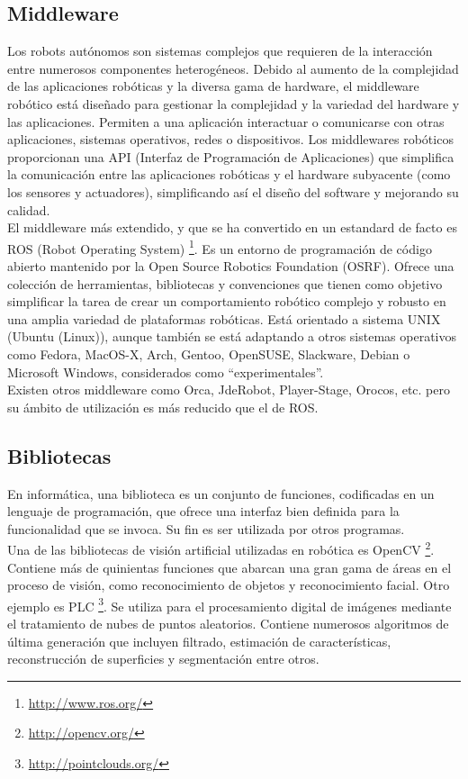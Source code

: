 \subsection{Middleware}
Los robots autónomos son sistemas complejos que requieren de la interacción entre numerosos componentes heterogéneos. Debido al aumento de la complejidad de las aplicaciones robóticas y la diversa gama de hardware, el middleware robótico está diseñado para gestionar la complejidad y la variedad del hardware y las aplicaciones. Permiten a una aplicación interactuar o comunicarse con otras aplicaciones, sistemas operativos, redes o dispositivos. Los middlewares robóticos proporcionan una API (Interfaz de Programación de Aplicaciones) que simplifica la comunicación entre las aplicaciones robóticas y el hardware subyacente (como los sensores y actuadores), simplificando así el diseño del software y mejorando su calidad. \\

El middleware más extendido, y que se ha convertido en un estandard de facto es ROS (Robot Operating System) \footnote{\url{http://www.ros.org/}}. Es un entorno de programación de código abierto mantenido por la Open Source Robotics Foundation (OSRF). Ofrece una colección de herramientas, bibliotecas y convenciones que tienen como objetivo simplificar la tarea de crear un comportamiento robótico complejo y robusto en una amplia variedad de plataformas robóticas. Está orientado a sistema UNIX (Ubuntu (Linux)), aunque también se está adaptando a otros sistemas operativos como Fedora, MacOS-X, Arch, Gentoo, OpenSUSE, Slackware, Debian o Microsoft Windows, considerados como ``experimentales''.\\

Existen otros middleware como Orca, JdeRobot, Player-Stage, Orocos, etc. pero su ámbito de utilización es más reducido
que el de ROS.
	

\subsection{Bibliotecas}
En informática, una biblioteca es un conjunto de funciones, codificadas en un lenguaje de programación, que ofrece una interfaz bien definida para la funcionalidad que se invoca. Su fin es ser utilizada por otros programas. \\

Una de las bibliotecas de visión artificial utilizadas en robótica es OpenCV \footnote{\url{http://opencv.org/}}. Contiene más de quinientas funciones que abarcan una gran gama de áreas en el proceso de visión, como reconocimiento de objetos y reconocimiento facial. Otro ejemplo es PLC \footnote{\url{http://pointclouds.org/}}. Se utiliza para el procesamiento digital de imágenes mediante el tratamiento de nubes de puntos aleatorios. Contiene numerosos algoritmos de última generación que incluyen filtrado, estimación de características, reconstrucción de superficies y segmentación entre otros. 

